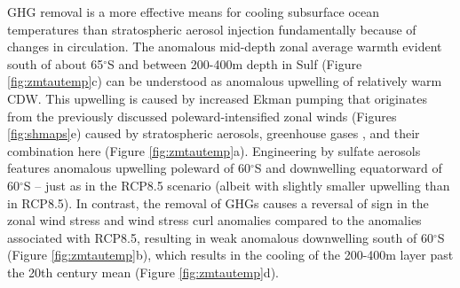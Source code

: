 \documentclass{nature}
\begin{document}
GHG removal is a more effective means for cooling subsurface ocean temperatures than stratospheric aerosol injection fundamentally because of changes in circulation. The anomalous mid-depth zonal average warmth evident south of about 65$^\circ$S and between 200-400m depth in Sulf (Figure \ref{fig:zmtautemp}c) can be understood as anomalous upwelling of relatively warm CDW. This upwelling is caused by increased Ekman pumping that originates from the previously discussed poleward-intensified zonal winds (Figures \ref{fig:shmaps}e) caused by stratospheric aerosols, greenhouse gases \cite{fyfe07}, and their combination here (Figure \ref{fig:zmtautemp}a). Engineering by sulfate aerosols features anomalous upwelling poleward of 60$^\circ$S and downwelling equatorward of 60$^\circ$S -- just as in the RCP8.5 scenario (albeit with slightly smaller upwelling than in RCP8.5). In contrast, the removal of GHGs causes a reversal of sign in the zonal wind stress and wind stress curl anomalies compared to the anomalies associated with RCP8.5, resulting in weak anomalous downwelling south of 60$^\circ$S (Figure \ref{fig:zmtautemp}b), which results in the cooling of the 200-400m layer past the 20th century mean (Figure \ref{fig:zmtautemp}d). 
\end{document}
